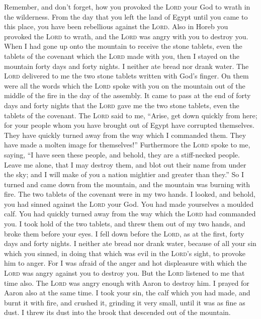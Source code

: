  Remember, and don't forget, how you provoked the
\textsc{Lord} your God to wrath in the wilderness. From the day that you
left the land of Egypt until you came to this place, you have been
rebellious against the \textsc{Lord}.  Also in Horeb you
provoked the \textsc{Lord} to wrath, and the \textsc{Lord} was angry
with you to destroy you.  When I had gone up onto the
mountain to receive the stone tablets, even the tablets of the covenant
which the \textsc{Lord} made with you, then I stayed on the mountain
forty days and forty nights. I neither ate bread nor drank water.
 The \textsc{Lord} delivered to me the two stone tablets
written with God's finger. On them were all the words which the
\textsc{Lord} spoke with you on the mountain out of the middle of the
fire in the day of the assembly.  It came to pass at the
end of forty days and forty nights that the \textsc{Lord} gave me the
two stone tablets, even the tablets of the covenant.  The
\textsc{Lord} said to me, ``Arise, get down quickly from here; for your
people whom you have brought out of Egypt have corrupted themselves.
They have quickly turned away from the way which I commanded them. They
have made a molten image for themselves!''  Furthermore
the \textsc{Lord} spoke to me, saying, ``I have seen these people, and
behold, they are a stiff-necked people.  Leave me alone,
that I may destroy them, and blot out their name from under the sky; and
I will make of you a nation mightier and greater than they.''
 So I turned and came down from the mountain, and the
mountain was burning with fire. The two tablets of the covenant were in
my two hands.  I looked, and behold, you had sinned
against the \textsc{Lord} your God. You had made yourselves a moulded
calf. You had quickly turned away from the way which the \textsc{Lord}
had commanded you.  I took hold of the two tablets, and
threw them out of my two hands, and broke them before your eyes.
 I fell down before the \textsc{Lord}, as at the first,
forty days and forty nights. I neither ate bread nor drank water,
because of all your sin which you sinned, in doing that which was evil
in the \textsc{Lord}'s sight, to provoke him to anger. 
For I was afraid of the anger and hot displeasure with which the
\textsc{Lord} was angry against you to destroy you. But the
\textsc{Lord} listened to me that time also.  The
\textsc{Lord} was angry enough with Aaron to destroy him. I prayed for
Aaron also at the same time.  I took your sin, the calf
which you had made, and burnt it with fire, and crushed it, grinding it
very small, until it was as fine as dust. I threw its dust into the
brook that descended out of the mountain.

